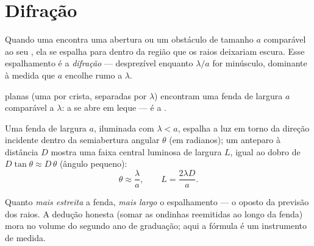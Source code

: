 \section{Difração}

\begin{definition}[Difração]\label{def:g12:light-as-wave:diffraction}
Quando uma  encontra uma abertura ou um obstáculo de tamanho $a$
comparável ao seu , ela se espalha para dentro da
região que os raios deixariam escura. Esse espalhamento é a
\emph{difração} --- desprezível enquanto $\lambda/a$ for
minúsculo, dominante à medida que $a$ encolhe rumo a $\lambda$.
\end{definition}

\begin{omfigure}

{\small {} planas (uma por crista, separadas por $\lambda$)
encontram uma fenda de largura $a$ comparável a $\lambda$: a  se abre
em leque --- é a .}
\end{omfigure}

\begin{proposition}\label{prop:g12:light-as-wave:halfwidth}
Uma fenda de largura $a$, iluminada com 
$\lambda < a$, espalha a luz em torno da direção incidente dentro da
semiabertura angular $\theta$ (em radianos); um anteparo à distância $D$
mostra uma faixa central luminosa de largura $L$, igual ao dobro de
$D \tan\theta \approx D\,\theta$ (ângulo pequeno):
\[
\theta \approx \frac{\lambda}{a}, \qquad L = \frac{2\lambda D}{a}.
\]
\end{proposition}
\admitted

\begin{remark}\label{rem:g12:light-as-wave:honest}
Quanto \emph{mais estreita} a fenda, \emph{mais largo} o espalhamento ---
o oposto da previsão dos raios. A dedução honesta (somar as ondinhas
reemitidas ao longo da fenda) mora no volume do segundo ano de graduação;
aqui a fórmula é um instrumento de medida.
\end{remark}

